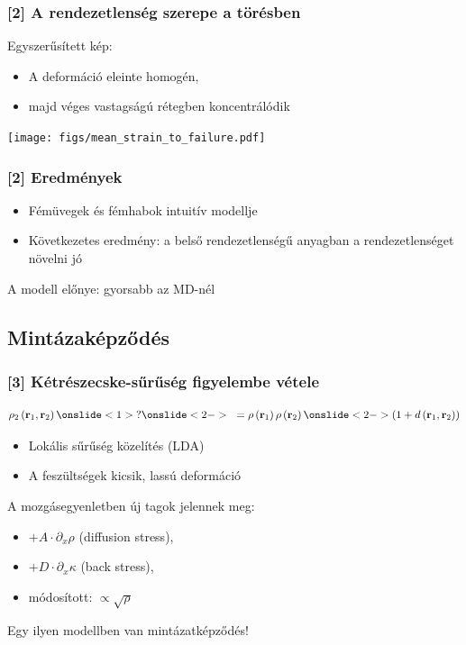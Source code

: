 \documentclass[12pt]{beamer}
\begin{document}
\begin{frame}
\frametitle{[2] A rendezetlenség szerepe a törésben}
\centering
Egyszerűsített kép:
\begin{itemize}
\item A deformáció eleinte homogén,
\item majd véges vastagságú rétegben koncentrálódik
\end{itemize}
\texttt{[image: figs/mean\_strain\_to\_failure.pdf]}
\end{frame}

\begin{frame}
\frametitle{[2] Eredmények}
\begin{itemize}
\item Fémüvegek és fémhabok intuitív modellje
\item Következetes eredmény: a belső rendezetlenségű anyagban a rendezetlenséget növelni jó
\end{itemize}
A modell előnye: gyorsabb az MD-nél
\end{frame}




\subsection{Mintázaképződés}
\begin{frame}
\frametitle{[3] Kétrészecske-sűrűség figyelembe vétele}
\[{\rho _2}\left( {{{\mathbf{r}}_1},{{\mathbf{r}}_2}} \right)\onslide<1>{?}\onslide<2->{~} = \rho \left( {{{\mathbf{r}}_1}} \right)\rho \left( {{{\mathbf{r}}_2}} \right)\onslide<2->\left( {1 + d\left( {{{\mathbf{r}}_1},{{\mathbf{r}}_2}} \right)} \right)\]
\begin{itemize}
\item Lokális sűrűség közelítés (LDA)
\item A feszültségek kicsik, lassú deformáció
\end{itemize}

\pause
A mozgásegyenletben új tagok jelennek meg:
\pause
\begin{itemize}
\item $ + A \cdot {\partial _x}\rho $ (diffusion stress),
\item $ + D \cdot {\partial _x}\kappa $ (back stress),
\item módosított: $\propto \sqrt{ \rho } $
\end{itemize}

Egy ilyen modellben van mintázatképződés!
\end{frame}
\end{document}
